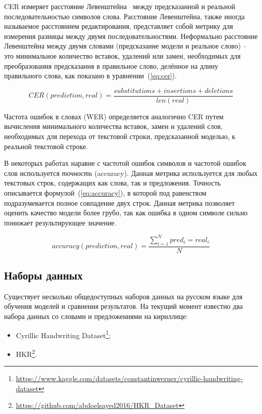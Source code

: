 CER измеряет расстояние Левенштейна~\cite{levenshtein1966binary} между предсказанной и реальной последовательностью символов слова.
Расстояние Левенштейна, также иногда называемое расстоянием редактирования,
представляет собой метрику для измерения разницы между двумя последовательностями.
Неформально расстояние Левенштейна между двумя словами (предсказание модели и реальное слово) --
это минимальное количество вставок, удалений или замен, необходимых для преобразования предсказания в правильное слово,
делённое на длину правильного слова, как показано в уравнении~(\ref{eq:cer}).

\begin{equation}
    \label{eq:cer}
    CER(prediction,real)=\frac{substitutions+insertions+deletions}{len(real)}
\end{equation}

Частота ошибок в словах (WER) определяется аналогично CER путем вычисления минимального количества вставок, замен и удалений слов,
необходимых для перехода от текстовой строки, предсказанной моделью, к реальной текстовой строке.

В некоторых работах наравне с частотой ошибок символов и частотой ошибок слов используется \textit{точность} (accuracy).
Данная метрика используется для любых текстовых строк, содержащих как слова, так и предложения.
Точность описывается формулой~(\ref{eq:accuracy}), в которой под равенством подразумевается полное совпадение двух строк.
Данная метрика позволяет оценить качество модели более грубо, так как ошибка в одном символе сильно понижает результирующее значение.

\begin{equation}
    \label{eq:accuracy}
    accuracy(prediction,real)=\frac{\sum_{i=1}^N pred_i = real_i}{N}
\end{equation}


\subsection{Наборы данных}
\label{subsec:datasets}

Существует несколько общедоступных наборов данных на русском языке для обучения моделей и сравнения результатов.
На текущий момент известно два набора данных со словами и предложениями на кириллице:
\begin{itemize}
    \item Cyrillic Handwriting Dataset\footnote{\url{https://www.kaggle.com/datasets/constantinwerner/cyrillic-handwriting-dataset}};
    \item HKR\footnote{\url{https://github.com/abdoelsayed2016/HKR_Dataset}}.
\end{itemize}


